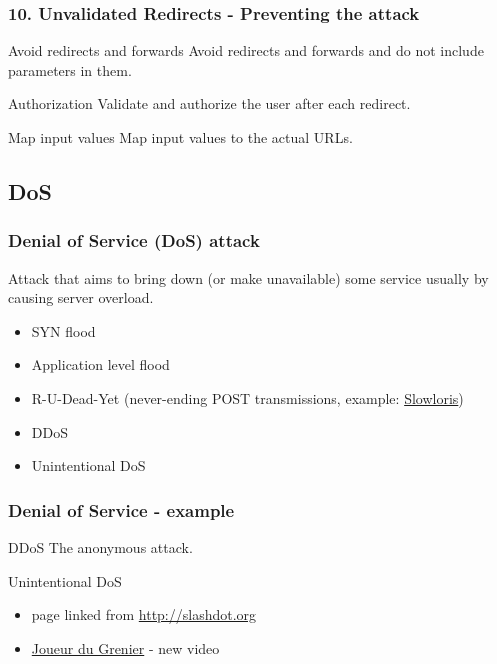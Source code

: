 \begin{frame}
\frametitle{10. Unvalidated Redirects - Preventing the attack}
\begin{block}{Avoid redirects and forwards}
Avoid redirects and forwards and do not include parameters in them.
\end{block}
\begin{block}{Authorization}
Validate and authorize the user after each redirect.
\end{block}
\begin{exampleblock}{Map input values}
Map input values to the actual URLs.
\end{exampleblock}
\end{frame}

\subsection{DoS}

\begin{frame}
\frametitle{Denial of Service (DoS) attack}
Attack that aims to bring down (or make unavailable) some service usually by
causing server overload.
\begin{itemize}
\item SYN flood
\item Application level flood
\item R-U-Dead-Yet
	\newline
	(never-ending POST transmissions,
	example: \href{http://ha.ckers.org/slowloris/}{Slowloris})
\item DDoS
\item Unintentional DoS
\end{itemize}
\end{frame}

\begin{frame}
\frametitle{Denial of Service - example}
\begin{exampleblock}{DDoS}
The anonymous attack.
\end{exampleblock}
\begin{exampleblock}{Unintentional DoS}
\begin{itemize}
\item page linked from \url{http://slashdot.org}
\item \href{http://www.joueurdugrenier.fr/}{Joueur du Grenier} - new video
\end{itemize}
\end{exampleblock}
\end{frame}


